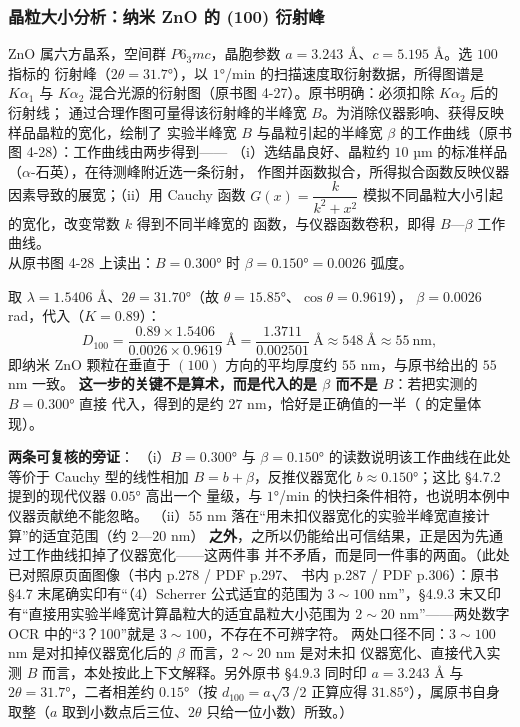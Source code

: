 \subsubsection{晶粒大小分析：纳米 ZnO 的 (100) 衍射峰}

\begin{example}
\begin{obs}
ZnO 属六方晶系，空间群 $P6_{3}mc$，晶胞参数 $a=3.243$ Å、$c=5.195$ Å。选 $100$ 指标的
衍射峰（$2\theta=31.7°$），以 $1°$/min 的扫描速度取衍射数据，所得图谱是 $K\alpha_{1}$ 与
$K\alpha_{2}$ 混合光源的衍射图（原书图 4-27）。原书明确：必须扣除 $K\alpha_{2}$ 后的衍射线；
通过合理作图可量得该衍射峰的半峰宽 $B$。为消除仪器影响、获得反映样品晶粒的宽化，绘制了
实验半峰宽 $B$ 与晶粒引起的半峰宽 $\beta$ 的工作曲线（原书图 4-28）：工作曲线由两步得到——
（i）选结晶良好、晶粒约 $10$ µm 的标准样品（$\alpha$-石英），在待测峰附近选一条衍射，
作图并函数拟合，所得拟合函数反映仪器因素导致的展宽；（ii）用 Cauchy 函数
$G(x)=\dfrac{k}{k^{2}+x^{2}}$ 模拟不同晶粒大小引起的宽化，改变常数 $k$ 得到不同半峰宽的
函数，与仪器函数卷积，即得 $B$—$\beta$ 工作曲线。\\
从原书图 4-28 上读出：$B=0.300°$ 时 $\beta=0.150°=0.0026$ 弧度。
\end{obs}
\begin{infer}
取 $\lambda=1.5406$ Å、$2\theta=31.70°$（故 $\theta=15.85°$、$\cos\theta=0.9619$），
$\beta=0.0026$ rad，代入（$K=0.89$）：
\begin{equation}
D_{100}=\frac{0.89\times1.5406}{0.0026\times0.9619}\ \text{Å}
=\frac{1.3711}{0.002501}\ \text{Å}\approx548\ \text{Å}\approx55\ \text{nm},
\label{eq:ch04c-znod}
\end{equation}
即纳米 ZnO 颗粒在垂直于 $(100)$ 方向的平均厚度约 $55$ nm，与原书给出的 $55$ nm 一致。
\textbf{这一步的关键不是算术，而是代入的是 $\beta$ 而不是 $B$}：若把实测的 $B=0.300°$ 直接
代入，得到的是约 $27$ nm，恰好是正确值的一半（ 的定量体现）。
\end{infer}
\textbf{两条可复核的旁证}：
（i）$B=0.300°$ 与 $\beta=0.150°$ 的读数说明该工作曲线在此处等价于 Cauchy 型的线性相加
$B=b+\beta$，反推仪器宽化 $b\approx0.150°$；这比 §4.7.2 提到的现代仪器 $0.05°$ 高出一个
量级，与 $1°$/min 的快扫条件相符，也说明本例中仪器贡献绝不能忽略。
（ii）$55$ nm 落在``用未扣仪器宽化的实验半峰宽直接计算''的适宜范围（约 $2$—$20$ nm）
\textbf{之外}，之所以仍能给出可信结果，正是因为先通过工作曲线扣掉了仪器宽化——这两件事
并不矛盾，而是同一件事的两面。（此处已对照原页面图像（书内 p.278 / PDF p.297、
书内 p.287 / PDF p.306）：原书 §4.7 末尾确实印有``（4）Scherrer 公式适宜的范围为
$3\sim100$ nm''，§4.9.3 末又印有``直接用实验半峰宽计算晶粒大的适宜晶粒大小范围为
$2\sim20$ nm''——两处数字 OCR 中的``3？100''就是 $3\sim100$，不存在不可辨字符。
两处口径不同：$3\sim100$ nm 是对扣掉仪器宽化后的 $\beta$ 而言，$2\sim20$ nm 是对未扣
仪器宽化、直接代入实测 $B$ 而言，本处按此上下文解释。另外原书 §4.9.3 同时印
$a=3.243$ Å 与 $2\theta=31.7°$，二者相差约 $0.15°$（按 $d_{100}=a\sqrt3/2$ 正算应得
$31.85°$），属原书自身取整（$a$ 取到小数点后三位、$2\theta$ 只给一位小数）所致。）
\end{example}

